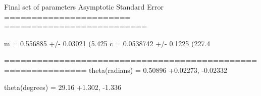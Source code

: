 Final set of parameters            Asymptotic Standard Error
=======================            ==========================

m               = 0.556885         +/- 0.03021      (5.425%
c               = 0.0538742        +/- 0.1225       (227.4%

=============================================================
theta(radians)	= 0.50896		+0.02273, -0.02332

theta(degrees)	= 29.16			+1.302, -1.336
